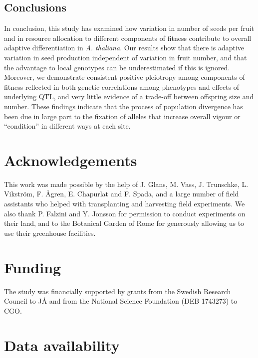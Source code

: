 \documentclass[12pt,]{article}
\begin{document}
\hypertarget{conclusions}{%
\subsection{Conclusions}\label{conclusions}}

In conclusion, this study has examined how variation in number of seeds per fruit and in resource allocation to different components of fitness contribute to overall adaptive differentiation in \emph{A. thaliana}. Our results show that there is adaptive variation in seed production independent of variation in fruit number, and that the advantage to local genotypes can be underestimated if this is ignored. Moreover, we demonstrate consistent positive pleiotropy among components of fitness reflected in both genetic correlations among phenotypes and effects of underlying QTL, and very little evidence of a trade-off between offspring size and number. These findings indicate that the process of population divergence has been due in large part to the fixation of alleles that increase overall vigour or ``condition'' in different ways at each site.

\hypertarget{acknowledgements}{%
\section{Acknowledgements}\label{acknowledgements}}

This work was made possible by the help of J. Glans, M. Vass, J. Trunschke, L. Vikström, F. Ågren, E. Chapurlat and F. Spada, and a large number of field assistants who helped with transplanting and harvesting field experiments. We also thank P. Falzini and Y. Jonsson for permission to conduct experiments on their land, and to the Botanical Garden of Rome for generously allowing us to use their greenhouse facilities.

\hypertarget{funding}{%
\section{Funding}\label{funding}}

The study was financially supported by grants from the Swedish Research Council to JÅ and from the National Science Foundation (DEB 1743273) to CGO.

\hypertarget{data-availability}{%
\section{Data availability}\label{data-availability}}
\end{document}
